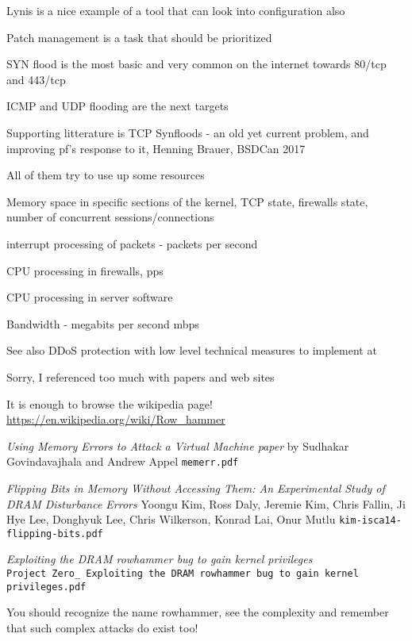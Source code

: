 \documentclass[Screen16to9,17pt]{foils}
\begin{document}
\begin{list2}
\item Lynis is a nice example of a tool that can look into configuration also
\item Patch management is a task that should be prioritized
\end{list2}




\begin{list2}
\item SYN flood is the most basic and very common on the internet towards 80/tcp and 443/tcp
\item ICMP and UDP flooding are the next targets
\item Supporting litterature is TCP Synfloods - an old yet current problem, and improving pf's response to it, Henning Brauer, BSDCan 2017
\item All of them try to use up some resources
\begin{list2}
\item Memory space in specific sections of the kernel, TCP state, firewalls state, number of concurrent sessions/connections
\item interrupt processing of packets - packets per second
\item CPU processing in firewalls, pps
\item CPU processing in server software
\item Bandwidth - megabits per second mbps
\end{list2}
\end{list2}

See also DDoS protection with low level technical measures to implement at\\
{\footnotesize {}}





Sorry, I referenced too much with papers and web sites
\begin{list2}
\item It is enough to browse the wikipedia page! \url{https://en.wikipedia.org/wiki/Row_hammer}

\item \emph{Using Memory Errors to Attack a Virtual Machine paper}
by Sudhakar Govindavajhala and Andrew Appel \verb+memerr.pdf+

\item \emph{Flipping Bits in Memory Without Accessing Them: An Experimental Study of DRAM Disturbance Errors} Yoongu Kim, Ross Daly, Jeremie Kim, Chris Fallin, Ji Hye Lee, Donghyuk Lee, Chris Wilkerson, Konrad Lai, Onur Mutlu
\verb+kim-isca14-flipping-bits.pdf+

\item \emph{Exploiting the DRAM rowhammer bug to gain kernel privileges} \\
 \verb+Project Zero_ Exploiting the DRAM rowhammer bug to gain kernel privileges.pdf+

\end{list2}

You should recognize the name rowhammer, see the complexity and remember that such complex attacks do exist too!

\slidenext
\end{document}
